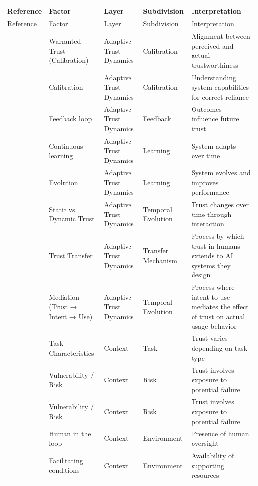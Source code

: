 \onecolumn
\begin{longtable}{l l l l p{4cm}}
\toprule
Reference & Factor & Layer & Subdivision & Interpretation \\
\midrule
\endfirsthead
\toprule
Reference & Factor & Layer & Subdivision & Interpretation \\
\midrule
\endhead
\cite{jacovi_2021_formalizing_trust_ai} & Warranted Trust (Calibration) & Adaptive Trust Dynamics & Calibration & Alignment between perceived and actual trustworthiness \\
\cite{carsten_hmi_automated_cars} & Calibration & Adaptive Trust Dynamics & Calibration & Understanding system capabilities for correct reliance \\
\cite{de_visser_longitudinal_trust} & Feedback loop & Adaptive Trust Dynamics & Feedback & Outcomes influence future trust \\
\cite{wang2019artificial} & Continuous learning & Adaptive Trust Dynamics & Learning & System adapts over time \\
\cite{wang2019artificial} & Evolution & Adaptive Trust Dynamics & Learning & System evolves and improves performance \\
\cite{vereschak2021evaluate} & Static vs. Dynamic Trust & Adaptive Trust Dynamics & Temporal Evolution & Trust changes over time through interaction \\
\cite{schepman_general_attitude} & Trust Transfer & Adaptive Trust Dynamics & Transfer Mechanism & Process by which trust in humans extends to AI systems they design \\
\cite{choudhury_chat_gpt} & Mediation (Trust → Intent → Use) & Adaptive Trust Dynamics & Temporal Evolution & Process where intent to use mediates the effect of trust on actual usage behavior \\
\cite{glickson_2020_review_of_empirical_research} & Task Characteristics & Context & Task & Trust varies depending on task type \\
\cite{jacovi_2021_formalizing_trust_ai} & Vulnerability / Risk & Context & Risk & Trust involves exposure to potential failure \\
\cite{de_visser_longitudinal_trust} & Vulnerability / Risk & Context & Risk & Trust involves exposure to potential failure \\
\cite{young_patient_systematic_review} & Human in the loop & Context & Environment & Presence of human oversight \\
\cite{chi_formative_scale} & Facilitating conditions & Context & Environment & Availability of supporting resources \\

\end{longtable}
